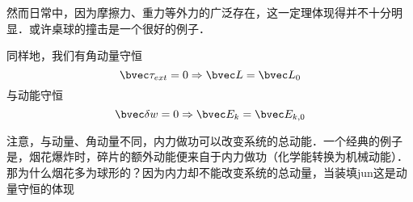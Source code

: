 然而日常中，因为摩擦力、重力等外力的广泛存在，这一定理体现得并不十分明显．或许桌球的撞击是一个很好的例子．

同样地，我们有角动量守恒
\begin{equation}
\bvec \tau_{ext} = 0 \Rightarrow \bvec L = \bvec L_0
\end{equation}
与动能守恒
\begin{equation}
\bvec \delta w = 0 \Rightarrow \bvec E_k = \bvec E_{k,0}
\end{equation}

注意，与动量、角动量不同，内力做功可以改变系统的总动能．一个经典的例子是，烟花爆炸时，碎片的额外动能便来自于内力做功（化学能转换为机械动能）．那为什么烟花多为球形的？因为内力却不能改变系统的总动量，当装填jun这是动量守恒的体现

